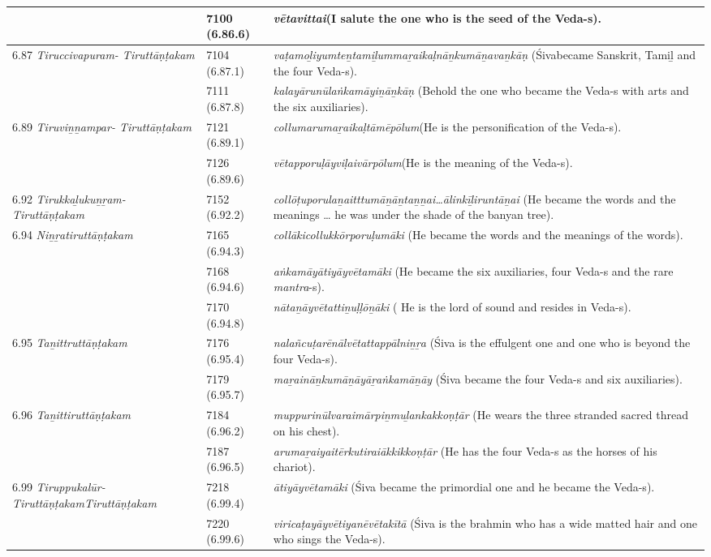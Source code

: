 \begin{longtable}{|m{2.7cm}|m{2.7cm}|>{\raggedright}m{3.1cm}|}
\hline
 & 7100 (6.86.6) & \textit{vētavittai}(I salute the one who is the seed of the Veda-s). \tabularnewline
\hline
6.87 \textit{Tiruccivapuram- Tiruttāṇṭakam} & 7104 (6.87.1) & \textit{vaṭamoḻiyumteṉtami\-ḻummaṟaikaḷnāṉku\-māṉavaṉkāṇ} (Śivabecame Sanskrit, Tamiḻ and the four Veda-s). \tabularnewline
\hline
 & 7111 (6.87.8) & \textit{kalayārunūlaṅkamāyi\-ṉāṉkāṇ} (Behold the one who became the Veda-s with arts and the six auxiliaries). \tabularnewline
\hline
6.89 \textit{Tiruviṉṉampar- Tiruttāṇṭakam} & 7121 (6.89.1) & \textit{collumarumaṟaikaḷ\-tāmēpōlum}(He is the personification of the Veda-s). \tabularnewline
\hline
 & 7126 (6.89.6) & \textit{vētapporuḷāyviḷaivār\-pōlum}(He is the meaning of the Veda-s). \tabularnewline
\hline
6.92 \textit{Tirukkaḻukuṉṟam- Tiruttāṇṭakam} & 7152 (6.92.2) & \textit{collōṭuporulaṉaitttu\-māṉāṉtaṉṉai…ālinkīḻi\-runtāṉai} (He became the words and the meanings … he was under the shade of the banyan tree). \tabularnewline
\hline
6.94 \textit{Niṉṟatiruttāṇṭakam} & 7165 (6.94.3) & \textit{collākicollukkōrporu\-ḷumāki} (He became the words and the meanings of the words). \tabularnewline
\hline
 & 7168 (6.94.6) & \textit{aṅkamāyātiyāyvēta\-māki} (He became the six auxiliaries, four Veda-s and the rare \textit{mantra}-s). \tabularnewline
\hline
 & 7170 (6.94.8) & \textit{nātaṉāyvētattiṉuḷḷōṉāki }( He is the lord of sound and resides in Veda-s). \tabularnewline
\hline
6.95 \textit{Taṉittruttāṇṭakam} & 7176 (6.95.4) & \textit{nalañcuṭarēnālvētatta\-ppālniṉṟa} (Śiva is the effulgent one and one who is beyond the four Veda-s). \tabularnewline
\hline
 & 7179 (6.95.7) & \textit{maṟaināṉkumāṉāyā\-ṟaṅkamāṉāy} (Śiva became the four Veda-s and six auxiliaries). \tabularnewline
\hline
6.96 \textit{Taṉittiruttāṇ\-ṭakam} & 7184 (6.96.2) & \textit{muppurinūlvaraimār\-piṉmuḻankakkoṇṭār} (He wears the three stranded sacred thread on his chest). \tabularnewline
\hline
 & 7187 (6.96.5) & \textit{arumaṟaiyaitērkuti\-raiākkikkoṇṭār} (He has the four Veda-s as the horses of his chariot). \tabularnewline
\hline
6.99 \textit{Tiruppukalūr- Tiruttāṇṭakam\-Tiruttāṇṭakam} & 7218 (6.99.4) & \textit{ātiyāyvētamāki} (Śiva became the primordial one and he became the Veda-s). \tabularnewline
\hline
 & 7220 (6.99.6) & \textit{viricaṭayāyvētiyanē\-vētakītā} (Śiva is the brahmin who has a wide matted hair and one who sings the Veda-s). \tabularnewline
\hline
\end{longtable}

\newpage

